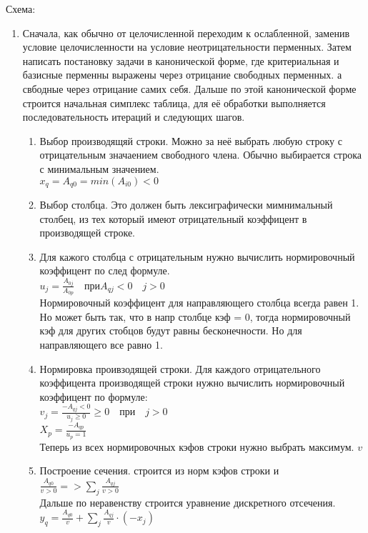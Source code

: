 Схема:
\begin{enumerate}
  \item Сначала, как обычно от целочисленной переходим к ослабленной,
  заменив условие целочисленности на условие неотрицательности перменных.
  Затем написать постановку задачи в канонической форме, где критериальная и базисные перменны выражены через отрицание свободных перменных.
  а свбодные через отрицание самих себя.
  Дальше по этой канонической форме строится начальная симплекс таблица, для её обработки выполняется последовательность итераций и следующих шагов.
  \begin{enumerate}
    \item Выбор производящяй строки. Можно за неё выбрать любую строку с отрицательным значаением свободного члена. Обычно выбирается строка с минимальным значением.\\
    $x_q = A_{q0} = min(A_{i0}) < 0 $\\
    \item Выбор столбца. Это должен быть лексиграфически мимнимальный столбец, из тех который имеют отрицательный коэффицент в производящей строке.

    \item Для кажого столбца с отрицательным  нужно вычислить нормировочный коэффицент по след формуле.\\
    $u_j = \frac{A_{0j}}{A_{0p}} \quad при  A_{qj} < 0 \quad j>0$ \\
    Нормировочный коэффицент для направляющего столбца всегда равен 1.
    Но может быть так, что в напр столбце кэф = 0, тогда нормировочный кэф для других стобцов будут равны бесконечности. Но для направляющего все равно 1.
    \item Нормировка проивзодящей строки. Для каждого отрицательного коэффицента производящей строки нужно вычислить нормировочный коэффицент по формуле:\\
    $v_j = \frac{-A_{qj} < 0}{u_j \geq 0}  \geq 0  \quad при   \quad j>0$\\
    $X_p = \frac{- A_{qp} }{u_p =1 }$\\
    Теперь из всех нормировочных кэфов строки нужно выбрать максимум. $v$
    \item Построение сечения. строится из норм кэфов строки и\\
    $ \frac{A_{q0}}{v>0} => \sum \limits_j  \frac{A_{qj}}{v>0}  $\\
    Дальше по неравенству строится уравнение дискретного отсечения.\\
    $ y_q = \frac{A_{q0}}{v} +  \sum \limits_j  \frac{A_{qj}}{v} \cdot (-x_j)   $


\end{enumerate}
\end{enumerate}
